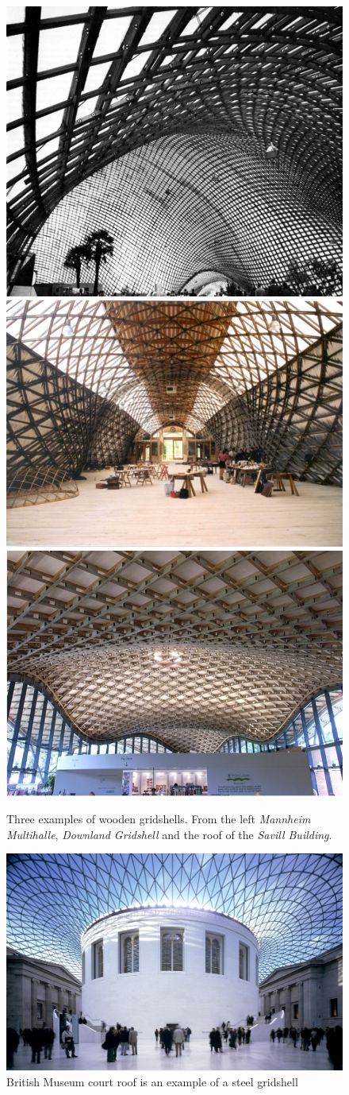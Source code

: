 \begin{figure}[H]
\centering
\includegraphics[width=0.3\linewidth ]{figure/Introduction/DownlandC.jpg}
\includegraphics[width=0.3\linewidth ]{figure/Introduction/Downland.jpg}
\includegraphics[width=0.3\linewidth ]{figure/Introduction/Savill.jpg}
\caption{Three examples of wooden gridshells. From the left \textit{Mannheim Multihalle}, \textit{ Downland Gridshell} and the roof of the \textit{Savill Building}.}
\end{figure}

\begin{figure}[H]
\centering
\includegraphics[width=0.9\linewidth ]{figure/Introduction/TheGreatCourt.jpg}
\caption{British Museum court roof is an example of a steel gridshell}
\end{figure}




